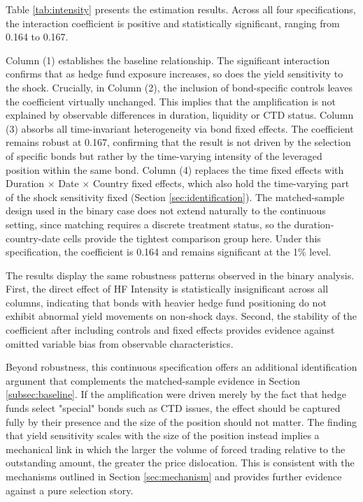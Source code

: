 \documentclass[english, 11pt, oneside]{article}
\begin{document}
Table \ref{tab:intensity} presents the estimation results. Across all four specifications, the interaction coefficient is positive and statistically significant, ranging from 0.164 to 0.167.

Column (1) establishes the baseline relationship. The significant interaction confirms that as hedge fund exposure increases, so does the yield sensitivity to the shock. Crucially, in Column (2), the inclusion of bond-specific controls leaves the coefficient virtually unchanged. This implies that the amplification is not explained by observable differences in duration, liquidity or CTD status. Column (3) absorbs all time-invariant heterogeneity via bond fixed effects. The coefficient remains robust at 0.167, confirming that the result is not driven by the selection of specific bonds but rather by the time-varying intensity of the leveraged position within the same bond. Column (4) replaces the time fixed effects with Duration $\times$ Date $\times$ Country fixed effects, which also hold the time-varying part of the shock sensitivity fixed (Section \ref{sec:identification}). The matched-sample design used in the binary case does not extend naturally to the continuous setting, since matching requires a discrete treatment status, so the duration-country-date cells provide the tightest comparison group here. Under this specification, the coefficient is 0.164 and remains significant at the 1\% level.

The results display the same robustness patterns observed in the binary analysis. First, the direct effect of HF Intensity is statistically insignificant across all columns, indicating that bonds with heavier hedge fund positioning do not exhibit abnormal yield movements on non-shock days. Second, the stability of the coefficient after including controls and fixed effects provides evidence against omitted variable bias from observable characteristics.

Beyond robustness, this continuous specification offers an additional identification argument that complements the matched-sample evidence in Section \ref{subsec:baseline}. If the amplification were driven merely by the fact that hedge funds select "special" bonds such as CTD issues, the effect should be captured fully by their presence and the size of the position should not matter. The finding that yield sensitivity scales with the size of the position instead implies a mechanical link in which the larger the volume of forced trading relative to the outstanding amount, the greater the price dislocation. This is consistent with the mechanisms outlined in Section \ref{sec:mechanism} and provides further evidence against a pure selection story.
\end{document}
